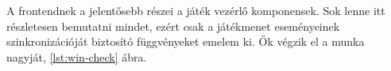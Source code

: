 
A frontendnek a jelentősebb részei a játék vezérlő komponensek. Sok lenne itt részletesen bemutatni mindet, ezért csak a játékmenet eseményeinek szinkronizációját biztosító függvényeket emelem ki. Ők végzik el a munka nagyját, \ref{lst:win-check} ábra.


















